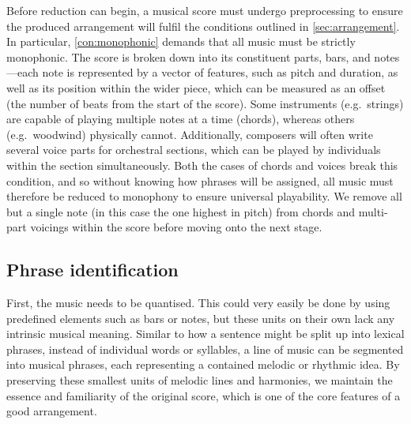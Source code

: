 \documentclass[twocolumn]{article}
\theoremstyle{definition}
\begin{document}
Before reduction can begin, a musical score must undergo preprocessing to ensure the produced arrangement will fulfil the conditions outlined in \cref{sec:arrangement}. In particular, \cref{con:monophonic} demands that all music must be strictly monophonic. The score is broken down into its constituent parts, bars, and notes---each note is represented by a vector of features, such as pitch and duration, as well as its position within the wider piece, which can be measured as an offset (the number of beats from the start of the score). Some instruments (e.g.\ strings) are capable of playing multiple notes at a time (chords), whereas others (e.g.\ woodwind) physically cannot. Additionally, composers will often write several voice parts for orchestral sections, which can be played by individuals within the section simultaneously. Both the cases of chords and voices break this condition, and so without knowing how phrases will be assigned, all music must therefore be reduced to monophony to ensure universal playability. We remove all but a single note (in this case the one highest in pitch) from chords and multi-part voicings within the score before moving onto the next stage.

\subsection{Phrase identification}

First, the music needs to be quantised. This could very easily be done by using predefined elements such as bars or notes, but these units on their own lack any intrinsic musical meaning. Similar to how a sentence might be split up into lexical phrases, instead of individual words or syllables, a line of music can be segmented into musical phrases, each representing a contained melodic or rhythmic idea. By preserving these smallest units of melodic lines and harmonies, we maintain the essence and familiarity of the original score, which is one of the core features of a good arrangement.
\end{document}
